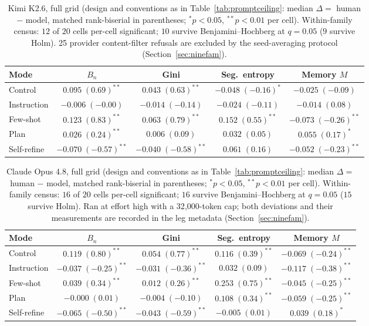 \documentclass{article}
\begin{document}
\begin{table}[htbp]
\centering
\small
\caption{Kimi K2.6, full grid (design and conventions as in Table~\ref{tab:promptceiling}: median $\Delta =$ human $-$ model, matched rank-biserial in parentheses; $^{*}p<0.05$, $^{**}p<0.01$ per cell). Within-family census: $12$ of $20$ cells per-cell significant; $10$ survive Benjamini--Hochberg at $q=0.05$ ($9$ survive Holm). 25 provider content-filter refusals are excluded by the seed-averaging protocol (Section~\ref{sec:ninefam}).}
\label{tab:grid-kimi-k26}
\begin{tabular}{lcccc}
\toprule
Mode & $B_n$ & Gini & Seg.\ entropy & Memory $M$ \\
\midrule
Control & $0.095\;(0.69)^{**}$ & $0.043\;(0.63)^{**}$ & $-0.048\;(-0.16)^{*}$ & $-0.025\;(-0.09)$ \\
Instruction & $-0.006\;(-0.00)$ & $-0.014\;(-0.14)$ & $-0.024\;(-0.11)$ & $-0.014\;(0.08)$ \\
Few-shot & $0.123\;(0.83)^{**}$ & $0.063\;(0.79)^{**}$ & $0.152\;(0.55)^{**}$ & $-0.073\;(-0.26)^{**}$ \\
Plan & $0.026\;(0.24)^{**}$ & $0.006\;(0.09)$ & $0.032\;(0.05)$ & $0.055\;(0.17)^{*}$ \\
Self-refine & $-0.070\;(-0.57)^{**}$ & $-0.040\;(-0.58)^{**}$ & $0.061\;(0.16)$ & $-0.052\;(-0.23)^{**}$ \\
\bottomrule
\end{tabular}
\end{table}

\begin{table}[htbp]
\centering
\small
\caption{Claude Opus 4.8, full grid (design and conventions as in Table~\ref{tab:promptceiling}: median $\Delta =$ human $-$ model, matched rank-biserial in parentheses; $^{*}p<0.05$, $^{**}p<0.01$ per cell). Within-family census: $16$ of $20$ cells per-cell significant; $16$ survive Benjamini--Hochberg at $q=0.05$ ($15$ survive Holm). Ran at effort high with a 32{,}000-token cap; both deviations and their measurements are recorded in the leg metadata (Section~\ref{sec:ninefam}).}
\label{tab:grid-opus-48}
\begin{tabular}{lcccc}
\toprule
Mode & $B_n$ & Gini & Seg.\ entropy & Memory $M$ \\
\midrule
Control & $0.119\;(0.80)^{**}$ & $0.054\;(0.77)^{**}$ & $0.116\;(0.39)^{**}$ & $-0.069\;(-0.24)^{**}$ \\
Instruction & $-0.037\;(-0.25)^{**}$ & $-0.031\;(-0.36)^{**}$ & $0.032\;(0.09)$ & $-0.117\;(-0.38)^{**}$ \\
Few-shot & $0.039\;(0.34)^{**}$ & $0.012\;(0.26)^{**}$ & $0.253\;(0.75)^{**}$ & $-0.045\;(-0.25)^{**}$ \\
Plan & $-0.000\;(0.01)$ & $-0.004\;(-0.10)$ & $0.108\;(0.34)^{**}$ & $-0.059\;(-0.25)^{**}$ \\
Self-refine & $-0.065\;(-0.50)^{**}$ & $-0.043\;(-0.59)^{**}$ & $-0.005\;(0.01)$ & $0.039\;(0.18)^{*}$ \\
\bottomrule
\end{tabular}
\end{table}
\end{document}
